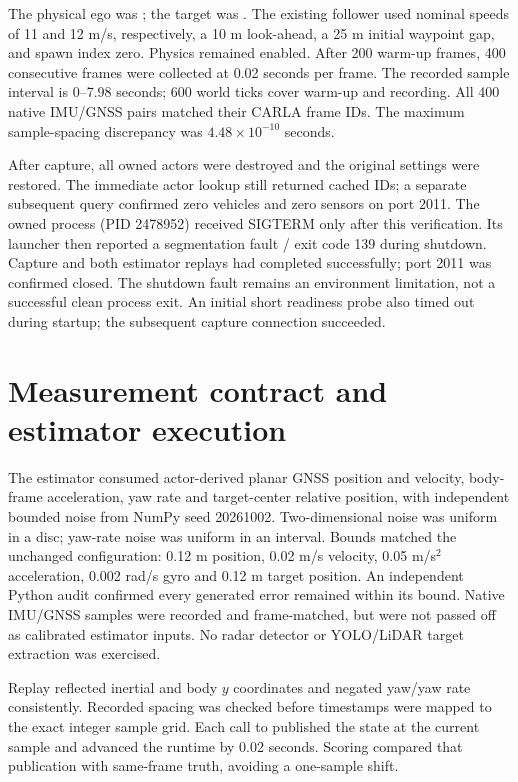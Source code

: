 \documentclass[11pt]{article}
\begin{document}
The physical ego was ; the target was
. The existing follower used nominal speeds of
11 and 12 m/s, respectively, a 10 m look-ahead, a 25 m initial waypoint gap,
and spawn index zero. Physics remained enabled. After 200 warm-up frames,
400 consecutive frames were collected at 0.02 seconds per frame. The recorded
sample interval is 0--7.98 seconds; 600 world ticks cover warm-up and recording.
All 400 native IMU/GNSS pairs matched their CARLA frame IDs. The maximum
sample-spacing discrepancy was $4.48\times10^{-10}$ seconds.

After capture, all owned actors were destroyed and the original settings
were restored. The immediate actor lookup still returned cached IDs; a separate
subsequent query confirmed zero vehicles and zero sensors on port 2011.
The owned process (PID 2478952) received SIGTERM only after this verification.
Its launcher then reported a segmentation fault / exit code 139 during
shutdown. Capture and both estimator replays had completed successfully;
port 2011 was confirmed closed. The shutdown fault remains an environment
limitation, not a successful clean process exit. An initial short readiness
probe also timed out during startup; the subsequent capture connection succeeded.

\section{Measurement contract and estimator execution}
The estimator consumed actor-derived planar GNSS position and velocity,
body-frame acceleration, yaw rate and target-center relative position, with
independent bounded noise from NumPy seed 20261002. Two-dimensional noise was
uniform in a disc; yaw-rate noise was uniform in an interval. Bounds matched
the unchanged configuration: 0.12 m position, 0.02 m/s velocity, 0.05 m/s$^2$
acceleration, 0.002 rad/s gyro and 0.12 m target position. An independent
Python audit confirmed every generated error remained within its bound.
Native IMU/GNSS samples were recorded and frame-matched, but were not passed
off as calibrated estimator inputs. No radar detector or YOLO/LiDAR target
extraction was exercised.

Replay reflected inertial and body $y$ coordinates and negated yaw/yaw rate
consistently. Recorded spacing was checked before timestamps were mapped to
the exact integer sample grid. Each call to
 published the state at the
current sample and advanced the runtime by 0.02 seconds. Scoring compared
that publication with same-frame truth, avoiding a one-sample shift.
\end{document}
